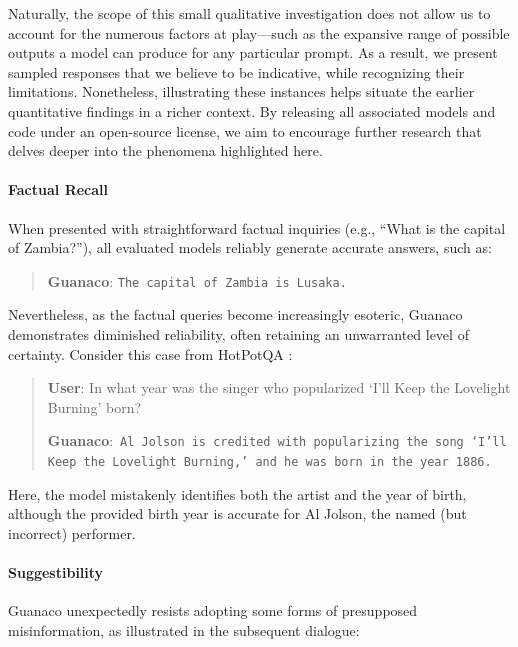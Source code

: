 Naturally, the scope of this small qualitative investigation does not allow us to account for the numerous factors at play—such as the expansive range of possible outputs a model can produce for any particular prompt. As a result, we present sampled responses that we believe to be indicative, while recognizing their limitations. Nonetheless, illustrating these instances helps situate the earlier quantitative findings in a richer context. By releasing all associated models and code under an open-source license, we aim to encourage further research that delves deeper into the phenomena highlighted here.

\paragraph{Factual Recall} When presented with straightforward factual inquiries (e.g., ``What is the capital of Zambia?''), all evaluated models reliably generate accurate answers, such as:

\begin{quote} 
    \textbf{Guanaco}:
    \texttt{The capital of Zambia is Lusaka.}
\end{quote}

Nevertheless, as the factual queries become increasingly esoteric, {Guanaco} demonstrates diminished reliability, often retaining an unwarranted level of certainty. Consider this case from HotPotQA \citep{yang2018hotpotqa}:

\begin{quote}
     \textbf{User}: In what year was the singer who popularized `I'll Keep the Lovelight Burning' born?  

     \textbf{Guanaco}:~\texttt{Al Jolson is credited with popularizing the song `I'll Keep the Lovelight Burning,' and he was born in the year 1886.}
 \end{quote}

Here, the model mistakenly identifies both the artist and the year of birth, although the provided birth year is accurate for Al Jolson, the named (but incorrect) performer.

\paragraph{Suggestibility} {Guanaco} unexpectedly resists adopting some forms of presupposed misinformation, as illustrated in the subsequent dialogue:

